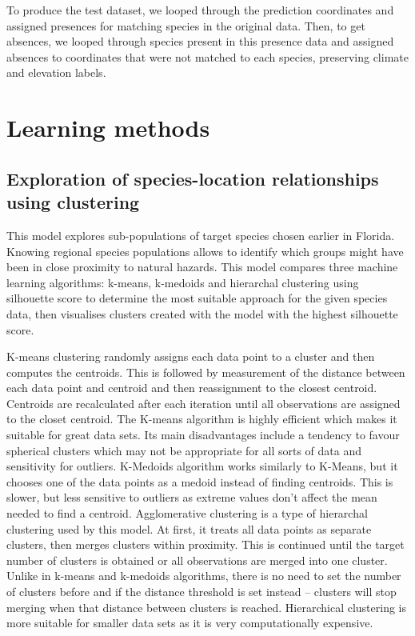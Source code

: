 \documentclass{article}
\begin{document}
To produce the test dataset, we  looped through the prediction coordinates and assigned presences for matching species in the original data. Then, to get absences, we looped through species present in this presence data and assigned absences to coordinates that were not matched to each species, preserving climate and elevation labels.

\section{Learning methods}
\subsection{Exploration of species-location relationships using clustering}\label{clustering_loc}

This model explores sub-populations of target species chosen earlier in Florida. Knowing regional species populations allows to identify which groups might have been in close proximity to natural hazards. This model compares three machine learning algorithms: k-means, k-medoids and hierarchal clustering using silhouette score to determine the most suitable approach for the given species data, then visualises clusters created with the model with the highest silhouette score.

K-means clustering randomly assigns each data point to a cluster and then computes the centroids. This is followed by measurement of the distance between each data point and centroid and then reassignment to the closest centroid. Centroids are recalculated after each iteration until all observations are assigned to the closet centroid. \cite{datacamp_ml} The K-means algorithm is highly efficient which makes it suitable for great data sets. Its main disadvantages include a tendency to favour spherical clusters which may not be appropriate for all sorts of data and sensitivity for outliers. K-Medoids algorithm works similarly to K-Means, but it chooses one of the data points as a medoid instead of finding centroids. This is slower, but less sensitive to outliers as extreme values don’t affect the mean needed to find a centroid. \cite{geeksforgeeks_kmeans} Agglomerative clustering is a type of hierarchal clustering used by this model. At first, it treats all data points as separate clusters, then merges clusters within proximity. This is continued until the target number of clusters is obtained or all observations are merged into one cluster. Unlike in k-means and k-medoids algorithms, there is no need to set the number of clusters before and if the distance threshold is set instead – clusters will stop merging when that distance between clusters is reached. \cite{geeksforgeeks_hierarchical, scikit_agglomerative} Hierarchical clustering is more suitable for smaller data sets as it is very computationally expensive.
\end{document}
